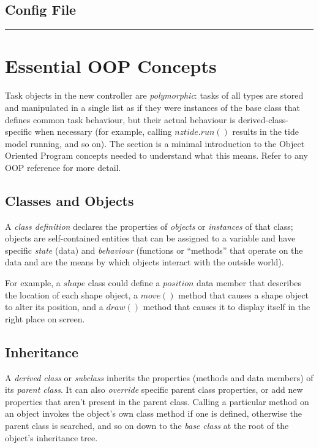 \documentclass[11pt,a4paper]{report}
\begin{document}
\lstset{language=Python}

\section{Config File}

\noindent
\rule{5cm}{.2mm}


\appendix

\chapter{Essential OOP Concepts}

Task objects in the new controller are {\em polymorphic}: tasks of all
types are stored and manipulated in a single list as if they were
instances of the base class that defines common task behaviour, but
their actual behaviour is derived-class-specific when necessary (for
example, calling $nztide.run()$ results in the tide model running, and
so on). The section is a minimal introduction to the Object Oriented
Program concepts needed to understand what this means.  Refer to any OOP
reference for more detail.

\section{Classes and Objects}

A {\em class definition} declares the properties of {\em objects} or
{\em instances} of that class; objects are self-contained entities that
can be assigned to a variable and have specific {\em state} (data) and
{\em behaviour} (functions or ``methods'' that operate on the data and
are the means by which objects interact with the outside world).    

For example, a $shape$ class could define a $position$ data member that
describes the location of each shape object, a $move()$ method that
causes a shape object to alter its position, and a $draw()$ method that
causes it to display itself in the right place on screen.

\section{Inheritance}

A {\em derived class} or {\em subclass} inherits the properties (methods
and data members) of its {\em parent class}. It can also {\em override}
specific parent class properties, or add new properties that aren't
present in the parent class. Calling a particular method on an object
invokes the object's own class method if one is defined, otherwise the
parent class is searched, and so on down to the {\em base class} at the
root of the object's inheritance tree. 
\end{document}
